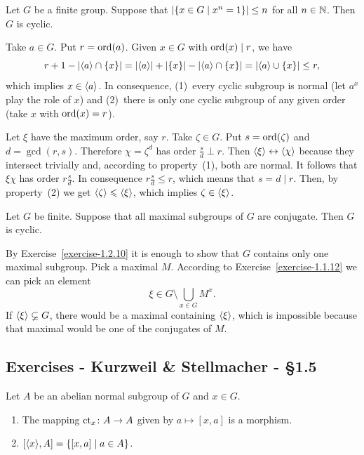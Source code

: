 \begin{exr}
    Let\/ $G$ be a finite group. Suppose that\/ $|\{x\in G \mid x^n = 1\}| \le n$ for all\/ $n\in\mathbb{N}$. Then\/ $G$ is cyclic.
\end{exr}

\begin{solution} Take $a\in G$. Put $r={\rm ord}(a)$. Given $x\in G$ with ${\rm ord}(x)\mid r$, we have
$$
    r+1-|\langle a\rangle\cap\{x\}|
        = |\langle a\rangle|+|\{x\}|-|\langle a\rangle\cap\{x\}|
        = |\langle a\rangle\cup\{x\}|\le r,
$$
which implies $x\in\langle a\rangle$. In consequence, (1)~every cyclic subgroup is normal (let $a^x$ play the role of $x$) and (2)~there is only one cyclic subgroup of any given order (take $x$ with ${\rm ord}(x)=r$).

Let $\xi$ have the maximum order, say $r$. Take $\zeta\in G$. Put $s={\rm ord}(\zeta)$ and $d=\gcd(r,s)$. Therefore $\chi=\zeta^d$ has order $\frac sd\perp r$. Then $\langle\xi\rangle\leftrightarrow\langle\chi\rangle$ because they intersect trivially and, according to property~(1), both are normal. It follows that $\xi\chi$ has order $r\frac sd$. In consequence $r\frac sd\le r$, which means that $s=d\mid r$. Then, by property~(2) we get $\langle\zeta\rangle\leqslant\langle\xi\rangle$, which implies $\zeta\in\langle\xi\rangle$.  \end{solution}

\begin{exr}
    Let\/ $G$ be finite. Suppose that all maximal subgroups of\/ $G$ are conjugate. Then\/ $G$ is cyclic.
\end{exr}

\begin{solution} By Exercise~\ref{exercise-1.2.10} it is enough to show that $G$ contains only one maximal subgroup. Pick a maximal $M$. According to Exercise~\ref{exercise-1.1.12} we can pick an element
$$
    \xi\in G\setminus\bigcup_{x\in G}M^x.
$$
If $\langle\xi\rangle\varsubsetneq G$, there would be a maximal containing $\langle\xi\rangle$, which is impossible because that maximal would be one of the conjugates of $M$.  \end{solution}

\subsection{Exercises - Kurzweil \& Stellmacher - \S 1.5}

\begin{exr}\label{exercise-1.5.1}
    Let\/ $A$ be an abelian normal subgroup of\/ $G$ and\/ $x \in G$.
    \begin{enumerate}[\upshape a)]
        \item The mapping\/ $\operatorname{\operatorname{ct}}_x\colon A\to A$ given by\/ $a \mapsto [x, a]$ is a morphism.
        \item $[\langle x\rangle, A] = \{[x, a] \mid a \in A\}$.
    \end{enumerate}
\end{exr}

